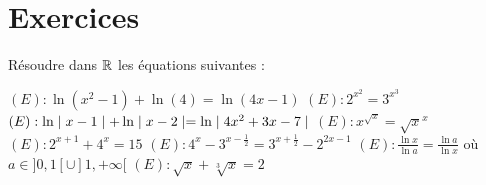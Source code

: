 \section{Exercices}



\begin{exercise}[subtitle= Résolution d'équations, difficulty=*]
	Résoudre dans $\mathbb{R}$ les équations suivantes :
		\begin{tasks}
		\task $(E): \ln(x^2-1)+\ln(4)=\ln(4x-1)$
		\task $(E): 2^{x^2}=3^{x^3}$
		\task $(E): \ln \mid x-1 \mid + \ln \mid x-2 \mid = \ln \mid 4x^2 + 3x-7 \mid$
		\task $(E): x^{\sqrt{x}}=\sqrt{x}^x$
	    \task $(E): 2^{x+1}+4^x = 15$
		\task $(E): 4^x - 3^{x-\frac{1}{2}} = 3^{x+\frac{1}{2}} -2^{2x-1}$ 
		\task $(E): \frac{\ln x}{\ln a} =\frac{\ln a}{\ln x}$ où $a\in ]0,1[\cup]1, +\infty[$
		\task $(E) : \sqrt{x} + \sqrt[3]{x}=2$
		\end{tasks}
\end{exercise}
